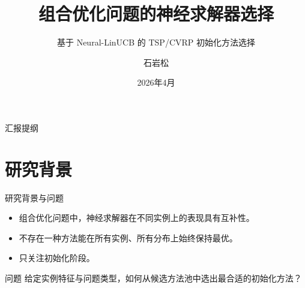 \documentclass{ctexbeamer}
\title[神经求解器选择]{组合优化问题的神经求解器选择}
\subtitle{基于 Neural-LinUCB 的 TSP/CVRP 初始化方法选择}
\author[石岩松]{石岩松}
\institute[SUSTech]{南方科技大学计算机科学与工程系\\\small 指导教师：王振坤}
\date{2026年4月}
\begin{document}
\begin{frame}{汇报提纲}
  \tableofcontents
\end{frame}

\section{研究背景}

\begin{frame}{研究背景与问题}
  \begin{itemize}
    \item 组合优化问题中，神经求解器在不同实例上的表现具有互补性。
    \item 不存在一种方法能在所有实例、所有分布上始终保持最优。
    \item 只关注初始化阶段。
  \end{itemize}

  \vspace{0.5em}
  \begin{block}{问题}
    给定实例特征与问题类型，如何从候选方法池中选出最合适的初始化方法？
  \end{block}
\end{frame}
\end{document}
